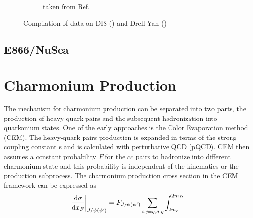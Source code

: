 \begin{figure}
\begin{subfigure}{0.45\linewidth}
\caption{taken from Ref.\ \cite{mcgaughey1999}}
\label{subfig:DY_scaling}
\end{subfigure}
\caption{Compilation of data on DIS () and Drell-Yan
 ()}
\end{figure}


\subsection{E866/NuSea}
\label{sec:E866}

\section{Charmonium Production}
\label{sec:jpsi}
The mechanism for charmonium production can be separated into two parts, the 
production of heavy-quark pairs and the subsequent hadronization into 
quarkonium states. One of the early approaches is the Color Evaporation method 
(CEM)\cite{einhorn1975,bodwin1995,bodwin1997}. The heavy-quark pairs production
is expanded in terms of the strong coupling constant s and is calculated with 
perturbative QCD (pQCD). CEM then assumes a constant probability $F$ for the 
$c\bar{c}$ pairs to hadronize into different charmonium state and this 
probability is independent of the kinematics or the production subprocess. The 
charmonium production cross section in the CEM framework can be expressed as
\begin{equation}
\eval{\dv{\sigma}{x_{F}}}_{J/\psi\left(\psi^\prime\right)} =
	F_{J/\psi\left(\psi^\prime\right)} \sum_{i,j=q,\bar{q},g} \int_{2m_c}^{2m_D}
\end{equation}




